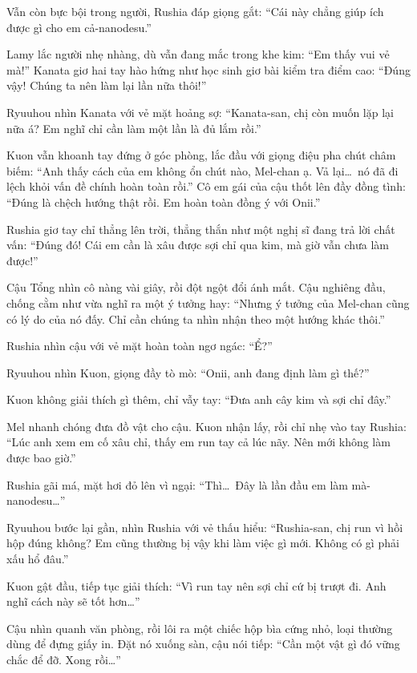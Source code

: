 \documentclass[../main.tex]{subfiles}
\begin{document}
Vẫn còn bực bội trong người, Rushia đáp giọng gắt: ``Cái này chẳng giúp ích được gì cho em cả-nanodesu.''

Lamy lắc người nhẹ nhàng, dù vẫn đang mắc trong khe kim: ``Em thấy vui vẻ mà!'' Kanata giơ hai tay hào hứng như học sinh giơ bài kiểm tra điểm cao: ``Đúng vậy! Chúng ta nên làm lại lần nữa thôi!''

Ryuuhou nhìn Kanata với vẻ mặt hoảng sợ: ``Kanata-san, chị còn muốn lặp lại nữa á? Em nghĩ chỉ cần làm một lần là đủ lắm rồi.''

Kuon vẫn khoanh tay đứng ở góc phòng, lắc đầu với giọng điệu pha chút châm biếm: ``Anh thấy cách của em không ổn chút nào, Mel-chan ạ. Vả lại\dots\ nó đã đi lệch khỏi vấn đề chính hoàn toàn rồi.'' Cô em gái của cậu thốt lên đầy đồng tình: ``Đúng là chệch hướng thật rồi. Em hoàn toàn đồng ý với Onii.''

Rushia giơ tay chỉ thẳng lên trời, thẳng thắn như một nghị sĩ đang trả lời chất vấn: ``Đúng đó! Cái em cần là xâu được sợi chỉ qua kim, mà giờ vẫn chưa làm được!''

Cậu Tổng nhìn cô nàng vài giây, rồi đột ngột đổi ánh mắt. Cậu nghiêng đầu, chống cằm như vừa nghĩ ra một ý tưởng hay: ``Nhưng ý tưởng của Mel-chan cũng có lý do của nó đấy. Chỉ cần chúng ta nhìn nhận theo một hướng khác thôi.''

Rushia nhìn cậu với vẻ mặt hoàn toàn ngơ ngác: ``Ể?''

Ryuuhou nhìn Kuon, giọng đầy tò mò: ``Onii, anh đang định làm gì thế?''

Kuon không giải thích gì thêm, chỉ vẫy tay: ``Đưa anh cây kim và sợi chỉ đây.''

Mel nhanh chóng đưa đồ vật cho cậu. Kuon nhận lấy, rồi chỉ nhẹ vào tay Rushia: ``Lúc anh xem em cố xâu chỉ, thấy em run tay cả lúc nãy. Nên mới không làm được bao giờ.''

Rushia gãi má, mặt hơi đỏ lên vì ngại: ``Thì\dots\ Đây là lần đầu em làm mà-nanodesu\dots''

Ryuuhou bước lại gần, nhìn Rushia với vẻ thấu hiểu: ``Rushia-san, chị run vì hồi hộp đúng không? Em cũng thường bị vậy khi làm việc gì mới. Không có gì phải xấu hổ đâu.''

Kuon gật đầu, tiếp tục giải thích: ``Vì run tay nên sợi chỉ cứ bị trượt đi. Anh nghĩ cách này sẽ tốt hơn\dots''

Cậu nhìn quanh văn phòng, rồi lôi ra một chiếc hộp bìa cứng nhỏ, loại thường dùng để đựng giấy in. Đặt nó xuống sàn, cậu nói tiếp: ``Cần một vật gì đó vững chắc để đỡ. Xong rồi\dots''
\end{document}
